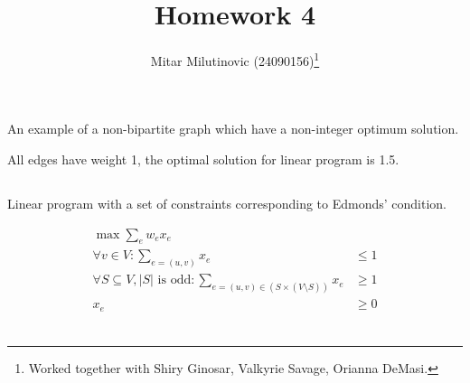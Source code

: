 \documentclass[a4paper,11pt,oneside,onecolumn]{article}
\title{Homework 4}
\author{Mitar Milutinovic (24090156)\thanks{Worked together with Shiry Ginosar, Valkyrie Savage, Orianna DeMasi.}}
\begin{document}
\maketitle

\section{}

\subsection{}

An example of a non-bipartite graph which have a non-integer optimum solution.

\begin{center}
\end{center}

All edges have weight 1, the optimal solution for linear program is 1.5.

\subsection{}

Linear program with a set of constraints corresponding to Edmonds' condition.

\begin{align*}
\max \sum_e w_e x_e &  \\
\forall v \in V: \sum_{e=(u,v)} x_e & \le 1 \\
\forall S \subseteq V, |S| \textrm{ is odd}: \sum_{e=(u,v) \in (S \times (V \setminus S))} x_e & \ge 1 \\
x_e & \ge 0 \\
\end{align*}

\subsection{}
\end{document}
